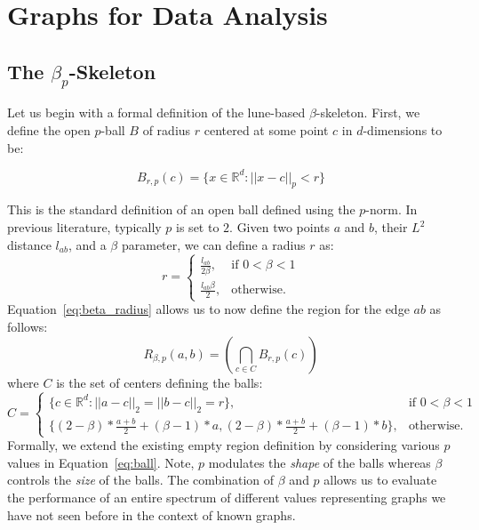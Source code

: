 
\chapter{Graphs for Data Analysis}
\label{ch:graphs}
\vspace{-2em}
\section{The $\beta_p$-Skeleton}
\label{sec:bpskeleton}
Let us begin with a formal definition of the lune-based $\beta$-skeleton.
%
First, we define the open $p$-ball $B$ of radius $r$ centered at some point $c$ in $d$-dimensions to be:

\begin{equation}
\label{eq:ball}
    B_{r,p}(c) = \{x \in \mathbb{R}^d : || x  - c ||_p < r\}
\end{equation}

This is the standard definition of an open ball defined using the $p$-norm.
%
In previous literature, typically $p$ is set to $2$.
%
Given two points $a$ and $b$, their $L^2$ distance $l_{ab}$, and a $\beta$ parameter, we can define a radius $r$ as:
%
\begin{equation}
    \label{eq:beta_radius}
    r =
    \begin{cases}
        \frac{l_{ab}}{2\beta}, & \text{if $0 < \beta < 1$}\\
        \frac{l_{ab}\beta}{2}, & \text{otherwise}.
    \end{cases}
\end{equation}
%
Equation~\ref{eq:beta_radius} allows us to now define the region for the edge $ab$ as follows:
%
\begin{equation}
    R_{\beta,p}(a,b) = \left(\bigcap_{c \in C} B_{r,p}(c)\right)
\end{equation}
%
where $C$ is the set of centers defining the balls:
%
\begin{equation}
C =
\begin{cases}
    \{c \in \mathbb{R}^d: ||a -c||_2 = ||b - c||_2 = r\}, & \text{if $0 < \beta < 1$}\\
    \{(2-\beta)*\frac{a+b}{2} + (\beta-1)*a, (2-\beta)*\frac{a+b}{2} + (\beta-1)*b\}, & \text{otherwise}.
\end{cases}
\end{equation}
%
Formally, we extend the existing empty region definition by considering various $p$ values in Equation~\ref{eq:ball}.
%
Note, $p$ modulates the \emph{shape} of the balls whereas $\beta$ controls the \emph{size} of the balls.
%
The combination of $\beta$ and $p$ allows us to evaluate the performance of an entire spectrum of different values representing graphs we have not seen before in the context of known graphs.

